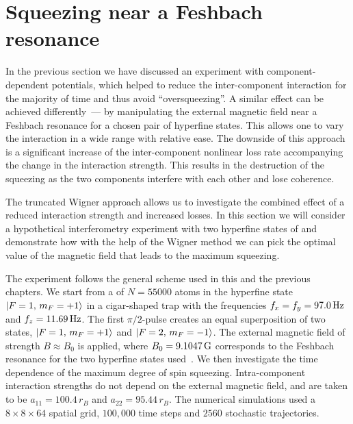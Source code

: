 \section{Squeezing near a Feshbach resonance}

In the previous section we have discussed an experiment with component-dependent potentials, which helped to reduce the inter-component interaction for the majority of time and thus avoid ``oversqueezing''.
A similar effect can be achieved differently~--- by manipulating the external magnetic field near a Feshbach resonance for a chosen pair of hyperfine states.
This allows one to vary the interaction in a wide range with relative ease.
The downside of this approach is a significant increase of the inter-component nonlinear loss rate accompanying the change in the interaction strength.
This results in the destruction of the squeezing as the two components interfere with each other and lose coherence.

The truncated Wigner approach allows us to investigate the combined effect of a reduced interaction strength and increased losses.
In this section we will consider a hypothetical interferometry experiment with two hyperfine states of \Rb{} and demonstrate how with the help of the Wigner method we can pick the optimal value of the magnetic field that leads to the maximum squeezing.

The experiment follows the general scheme used in this and the previous chapters.
We start from a  of $N = 55000$ \Rb{} atoms in the hyperfine state ${\mbox{\ensuremath{\left\vert F=1,\, m_F=+1 \right\rangle}}}$ in a cigar-shaped trap with the frequencies $f_x = f_y = 97.0\mbox{\ensuremath{\,\mathrm{Hz}}}$ and $f_z = 11.69\mbox{\ensuremath{\,\mathrm{Hz}}}$.
The first $\pi/2$-pulse creates an equal superposition of two states, ${\mbox{\ensuremath{\left\vert F=1,\, m_F=+1 \right\rangle}}}$ and ${\mbox{\ensuremath{\left\vert F=2,\, m_F=-1 \right\rangle}}}$.
The external magnetic field of strength $B \approx B_0$ is applied, where $B_0 = 9.1047\mbox{\ensuremath{\,\mathrm{G}}}$ corresponds to the Feshbach resonance for the two hyperfine states used~\cite{Kaufman2009}.
We then investigate the time dependence of the maximum degree of spin squeezing.
Intra-component interaction strengths do not depend on the external magnetic field, and are taken to be $a_{11} = 100.4\,r_B$ and $a_{22} = 95.44\,r_B$.
The numerical simulations used a $8\times8\times64$ spatial grid, $100,000$ time steps and $2560$ stochastic trajectories.

